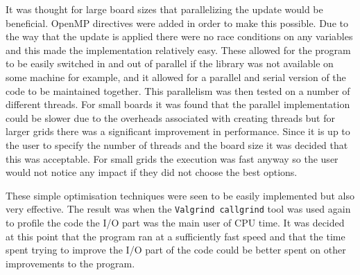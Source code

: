 It was thought for large board sizes that parallelizing the update would be beneficial.
OpenMP directives were added in order to make this possible.
Due to the way that the update is applied there were no race conditions on any variables and this made the implementation relatively easy.
These allowed for the program to be easily switched in and out of parallel if the library was not available on some machine for example, and it allowed for a parallel and serial version of the code to be maintained together.
This parallelism was then tested on a number of different threads.
For small boards it was found that the parallel implementation could be slower due to the overheads associated with creating threads but for larger grids there was a significant improvement in performance.
Since it is up to the user to specify the number of threads and the board size it was decided that this was acceptable.
For small grids the execution was fast anyway so the user would not notice any impact if they did not choose the best options.

These simple optimisation techniques were seen to be easily implemented but also very effective.
The result was when the \texttt{Valgrind callgrind} tool was used again to profile the code the I/O part was the main user of CPU time.
It was decided at this point that the program ran at a sufficiently fast speed and that the time spent trying to improve the I/O part of the code could be better spent on other improvements to the program.
